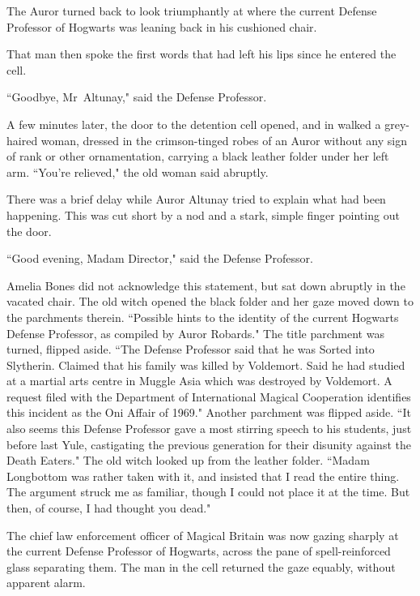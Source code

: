 The Auror turned back to look triumphantly at where the current Defense Professor of Hogwarts was leaning back in his cushioned chair.

That man then spoke the first words that had left his lips since he entered the cell.

``Goodbye, Mr~Altunay," said the Defense Professor.

A few minutes later, the door to the detention cell opened, and in walked a grey-haired woman, dressed in the crimson-tinged robes of an Auror without any sign of rank or other ornamentation, carrying a black leather folder under her left arm. ``You're relieved," the old woman said abruptly.

There was a brief delay while Auror Altunay tried to explain what had been happening. This was cut short by a nod and a stark, simple finger pointing out the door.

``Good evening, Madam Director," said the Defense Professor.

Amelia Bones did not acknowledge this statement, but sat down abruptly in the vacated chair. The old witch opened the black folder and her gaze moved down to the parchments therein. ``Possible hints to the identity of the current Hogwarts Defense Professor, as compiled by Auror Robards." The title parchment was turned, flipped aside. ``The Defense Professor said that he was Sorted into Slytherin. Claimed that his family was killed by Voldemort. Said he had studied at a martial arts centre in Muggle Asia which was destroyed by Voldemort. A request filed with the Department of International Magical Cooperation identifies this incident as the Oni Affair of 1969." Another parchment was flipped aside. ``It also seems this Defense Professor gave a most stirring speech to his students, just before last Yule, castigating the previous generation for their disunity against the Death Eaters." The old witch looked up from the leather folder. ``Madam Longbottom was rather taken with it, and insisted that I read the entire thing. The argument struck me as familiar, though I could not place it at the time. But then, of course, I had thought you dead."

The chief law enforcement officer of Magical Britain was now gazing sharply at the current Defense Professor of Hogwarts, across the pane of spell-reinforced glass separating them. The man in the cell returned the gaze equably, without apparent alarm.

